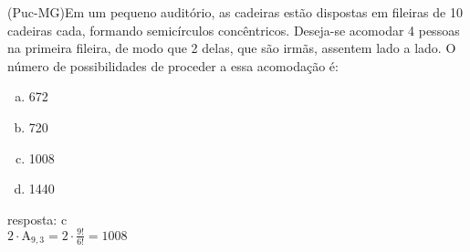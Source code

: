 \begin{ex}
(Puc-MG)Em um pequeno auditório, as cadeiras estão dispostas em fileiras de 10 cadeiras cada, formando semicírculos concêntricos. Deseja-se acomodar 4 pessoas na primeira fileira, de modo que 2 delas, que são irmãs, assentem lado a lado. O número de possibilidades de proceder a essa acomodação é:
   \begin{enumerate}[(a)]
   \item 672
   \item 720
   \item 1008
   \item 1440
   \end{enumerate}
     \begin{sol}
      resposta: c \\
      $2\cdot\mathrm{A}_{9,3}=2\cdot\frac{9!}{6!}=1008$
     \end{sol}
\end{ex}